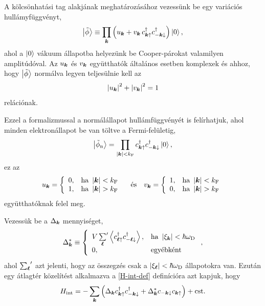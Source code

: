 \documentclass[a4paper,12pt,titlepage]{article}
\newcommand{\KK}{{\vb*{k}}}
\newcommand{\LL}{{\vb*{\ell}}}
\begin{document}
A kölcsönhatási tag alakjának meghatározásához vezessünk be egy variációs hullámyfüggvényt,
\begin{equation}
	\ket{\tilde{\phi}} \equiv \prod\limits_\KK \left( u_\KK + v_\KK \, c_{\KK \uparrow}^\dagger c_{-\KK \downarrow}^\dagger \right) \ket{0},
\end{equation}
ahol a $\ket{0}$ vákuum állapotba helyezünk be Cooper-párokat valamilyen amplitúdóval.  Az $u_\KK$ és $v_\KK$ együtthatók általános esetben komplexek és ahhoz, hogy $\ket{\tilde{\phi}}$ normálva legyen teljesülnie kell az
\begin{equation}
	\left| u_\KK \right|^2 + \left| v_\KK \right|^2 = 1
\end{equation}
relációnak.

Ezzel a formalizmussal a normálállapot hullámfüggvényét is felírhatjuk, ahol minden elektronállapot be van töltve a Fermi-felületig,
\begin{equation}
	\ket{\tilde{\phi}_\text{n}} = \prod\limits_{\left| \KK \right| < k_\text{F}} c_{\KK \uparrow}^\dagger c_{-\KK \downarrow}^\dagger \ket{0},
\end{equation}
ez az
\begin{equation}
	u_\KK = \left\{ \begin{array}{ll} 0, & \text{ha } \left| \KK \right| < k_\text{F} \\ 1, & \text{ha } \left| \KK \right| > k_\text{F} \end{array} \right.
	~~~ \text{és} ~~~
	v_\KK = \left\{ \begin{array}{ll} 1, & \text{ha } \left| \KK \right| < k_\text{F} \\ 0, & \text{ha } \left| \KK \right| > k_\text{F} \end{array} \right.
\end{equation}
együtthatóknak felel meg.

Vezessük be a $\Delta_\KK$ mennyiséget,
\begin{equation}
	\Delta_\KK^* \equiv \left\{ \begin{array}{ll}
	V \, {\sum\limits_\LL}^\prime \expval{c_{\LL \uparrow}^\dagger c_{-\LL \downarrow}^\dagger}, & \text{ha } \left| \xi_\KK \right| < \hbar \omega_\text{D} \\
	0, & \text{egyébként}
	\end{array} \right. ,
\end{equation}
ahol ${\sum_\LL}^\prime$ azt jelenti, hogy az összegzés csak a $\left| \xi_\LL \right| < \hbar \omega_\text{D}$ állapotokra van.  Ezután egy átlagtér közelítést alkalmazva a \eqref{H-int-def} definícióra azt kapjuk, hogy
\begin{equation}
	H_\text{int} = - \sum\limits_\KK \left( \Delta_\KK c_{\KK \uparrow}^\dagger c_{-\KK \downarrow}^\dagger + \Delta_\KK^* c_{-\KK \downarrow} c_{\KK \uparrow} \right) + \text{cst}.
\end{equation}
\end{document}
